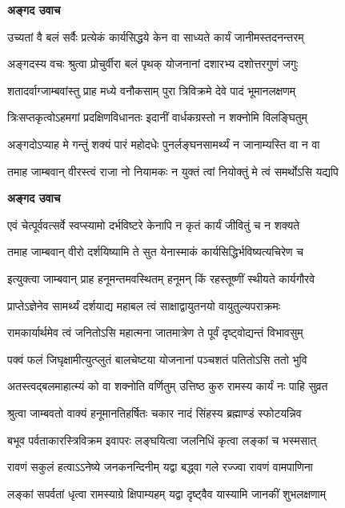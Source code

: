 \textbf{अङ्गद उवाच}

\twolineshloka
{उच्यतां वै बलं सर्वैः प्रत्येकं कार्यसिद्धये}
{केन वा साध्यते कार्यं जानीमस्तदनन्तरम्} %

\twolineshloka
{अङ्गदस्य वचः श्रुत्वा प्रोचुर्वीरा बलं पृथक्}
{योजनानां दशारभ्य दशोत्तरगुणं जगुः} %

\twolineshloka
{शतादर्वाग्जाम्बवांस्तु प्राह मध्ये वनौकसाम्}
{पुरा त्रिविक्रमे देवे पादं भूमानलक्षणम्} %

\twolineshloka
{त्रिःसप्तकृत्वोऽहमगां प्रदक्षिणविधानतः}
{इदानीं वार्धकग्रस्तो न शक्नोमि विलङ्घितुम्} %

\twolineshloka
{अङ्गदोऽप्याह मे गन्तुं शक्यं पारं महोदधेः}
{पुनर्लङ्घनसामर्थ्यं न जानाम्यस्ति वा न वा} %

\twolineshloka
{तमाह जाम्बवान् वीरस्त्वं राजा नो नियामकः}
{न युक्तं त्वां नियोक्तुं मे त्वं समर्थोऽसि यद्यपि} %

\textbf{अङ्गद उवाच}

\twolineshloka
{एवं चेत्पूर्ववत्सर्वे स्वप्स्यामो दर्भविष्टरे}
{केनापि न कृतं कार्यं जीवितुं च न शक्यते} %

\twolineshloka
{तमाह जाम्बवान् वीरो दर्शयिष्यामि ते सुत}
{येनास्माकं कार्यसिद्धिर्भविष्यत्यचिरेण च} %

\twolineshloka
{इत्युक्त्वा जाम्बवान् प्राह हनूमन्तमवस्थितम्}
{हनूमन् किं रहस्तूष्णीं स्थीयते कार्यगौरवे} %

\twolineshloka
{प्राप्तेऽज्ञेनेव सामर्थ्यं दर्शयाद्य महाबल}
{त्वं साक्षाद्वायुतनयो वायुतुल्यपराक्रमः} %

\twolineshloka
{रामकार्यार्थमेव त्वं जनितोऽसि महात्मना}
{जातमात्रेण ते पूर्वं दृष्ट्वोद्यन्तं विभावसुम्} %

\twolineshloka
{पक्वं फलं जिघृक्षामीत्युत्प्लुतं बालचेष्टया}
{योजनानां पञ्चशतं पतितोऽसि ततो भुवि} %

\twolineshloka
{अतस्त्वद्बलमाहात्म्यं को वा शक्नोति वर्णितुम्}
{उत्तिष्ठ कुरु रामस्य कार्यं नः पाहि सुव्रत} %

\twolineshloka
{श्रुत्वा जाम्बवतो वाक्यं हनूमानतिहर्षितः}
{चकार नादं सिंहस्य ब्रह्माण्डं स्फोटयन्निव} %

\twolineshloka
{बभूव पर्वताकारस्त्रिविक्रम इवापरः}
{लङ्घयित्वा जलनिधिं कृत्वा लङ्कां च भस्मसात्} %

\twolineshloka
{रावणं सकुलं हत्वाऽऽनेष्ये जनकनन्दिनीम्}
{यद्वा बद्ध्वा गले रज्ज्वा रावणं वामपाणिना} %

\twolineshloka
{लङ्कां सपर्वतां धृत्वा रामस्याग्रे क्षिपाम्यहम्}
{यद्वा दृष्ट्वैव यास्यामि जानकीं शुभलक्षणाम्} %

